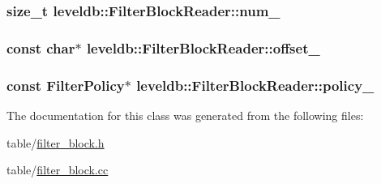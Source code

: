 \subsubsection[{num\+\_\+}]{\setlength{\rightskip}{0pt plus 5cm}size\+\_\+t leveldb\+::\+Filter\+Block\+Reader\+::num\+\_\+\hspace{0.3cm}{\ttfamily [private]}}\label{classleveldb_1_1_filter_block_reader_a6805c65b69099abe85ec0863bdaf9842}
\hypertarget{classleveldb_1_1_filter_block_reader_a64ae9da0d51b09f6d6c23723f486e0e0}{}
\subsubsection[{offset\+\_\+}]{\setlength{\rightskip}{0pt plus 5cm}const char$\ast$ leveldb\+::\+Filter\+Block\+Reader\+::offset\+\_\+\hspace{0.3cm}{\ttfamily [private]}}\label{classleveldb_1_1_filter_block_reader_a64ae9da0d51b09f6d6c23723f486e0e0}
\hypertarget{classleveldb_1_1_filter_block_reader_a4010e6ad3e0aff23a10260eae3669cdd}{}
\subsubsection[{policy\+\_\+}]{\setlength{\rightskip}{0pt plus 5cm}const {\bf Filter\+Policy}$\ast$ leveldb\+::\+Filter\+Block\+Reader\+::policy\+\_\+\hspace{0.3cm}{\ttfamily [private]}}\label{classleveldb_1_1_filter_block_reader_a4010e6ad3e0aff23a10260eae3669cdd}


The documentation for this class was generated from the following files\+:\begin{DoxyCompactItemize}
\item 
table/\hyperlink{filter__block_8h}{filter\+\_\+block.\+h}\item 
table/\hyperlink{filter__block_8cc}{filter\+\_\+block.\+cc}\end{DoxyCompactItemize}

